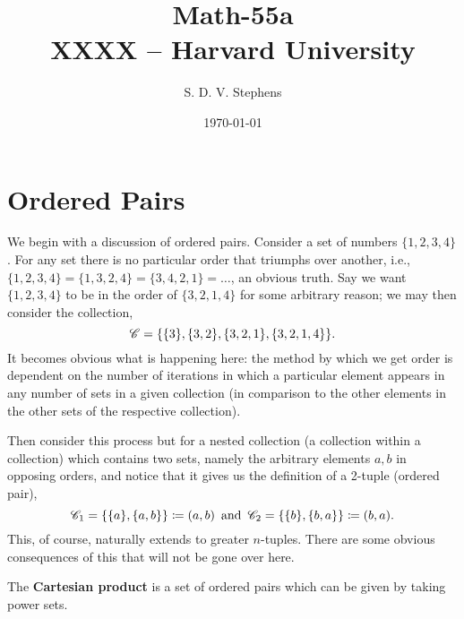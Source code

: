 \documentclass{report}
\title{\Huge{Math-55a}\\XXXX -- Harvard University}
\author{\huge{S. D. V. Stephens}}
\date{\today}
\begin{document}
\maketitle
\newpage
{}
\tableofcontents
\pagebreak




\section{Ordered Pairs}
We begin with a discussion of ordered pairs. Consider a set of numbers \( \{1,2,3,4\}   \). For any set there is no particular order that triumphs over another, i.e., \( \{1,2,3,4\} = \{1,3,2,4\} = \{3,4,2,1\} =\ldots     \), an obvious truth. Say we want \( \{1,2,3,4\}   \) to be in the order of \( \{3,2,1,4\}   \) for some arbitrary reason; we may then consider the collection,
\[
  {\mathscr{C}} = \{\{3\} , \{3,2\} ,\{3,2,1\} , \{3,2,1,4\}     \}
.\] 
It becomes obvious what is happening here: the method by which we get order is dependent on the number of iterations in which a particular element appears in any number of sets in a given collection (in comparison to the other elements in the other sets of the respective collection). 

Then consider this process but for a nested collection (a collection within a collection) which contains two sets, namely the arbitrary elements \( a,b \) in opposing orders, and notice that it gives us the definition of a 2-tuple (ordered pair),
\[
  {\mathscr{C}}_{1} = \{\{a\} ,\{a,b\}   \} \coloneqq (a,b) \, \text{ and }\, {\mathscr{C}}_{2}  = \{\{b\} ,\{b,a\}   \} \coloneqq  (b,a)  
.\] 
This, of course, naturally extends to greater \( n \)-tuples. There are some obvious consequences of this that will not be gone over here. 

The \textbf{Cartesian product} is a set of ordered pairs which can be given by taking power sets. 

\end{document}
